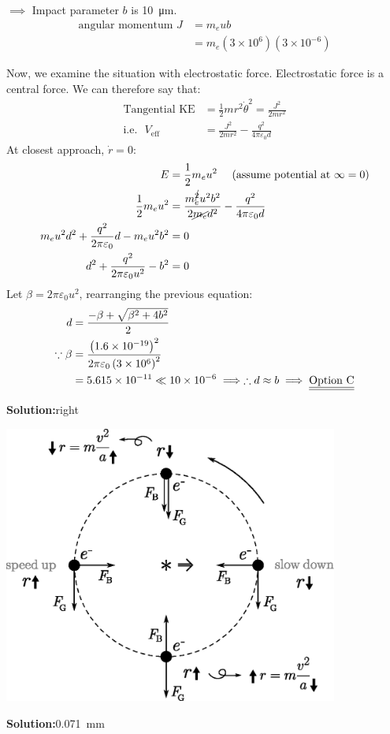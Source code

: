 \documentclass[11pt]{article}
\newcommand*\circled[1]{\tikz[baseline=(char.base)]{
		\node[shape=circle,draw,inner sep=2pt] (char) {#1};}}
\def\doubleunderline#1{\underline{\underline{#1}}}
\newcommand{\solution}[2]{\textbf{Solution:\hspace{1em}\circled{#1}}\hspace{1em}#2\hspace{1em}}
\begin{document}
\begin{enumerate}[label={[Q\arabic*]},itemsep={1em}]
\begin{minipage}{\textwidth - 5.1cm}
				$\implies$ Impact parameter $b$ is \SI{10}{\micro\meter}.
				\begin{align*}
					\text{angular momentum } J &= m_e u b \\
					 &= m_e\left(3\times 10^6\right)\left(3\times10^{-6}\right)
				\end{align*}
			\end{minipage}
		
			Now, we examine the situation with electrostatic force. Electrostatic force is a central force.  We can therefore say that:
			\begin{align}
				\text{Tangential KE} &= \frac{1}{2}mr^2\dot{\theta}^2 = \frac{J^2}{2mr^2} \\
				\text{i.e. ~} V_{\text{eff}} &= \frac{J^2}{2mr^2} - \frac{q^2}{4\pi\varepsilon_0 d}
			\end{align}
			At closest approach, $\dot{r} = 0$:
			\begin{align*}
				E &= \frac{1}{2} m_eu^2 \text{~~~~(assume potential at $\infty = 0$)} \\
				\frac{1}{2}m_eu^2 &= \frac{m_e^{\cancel{2}}u^2b^2}{2\cancel{m_e}d^2} - \frac{q^2}{4\pi\varepsilon_0 d}\\
				m_e u^2d^2 + \frac{q^2}{2\pi \varepsilon_0}d - m_eu^2b^2 &=	0 \\
				d^2 + \frac{q^2}{2\pi\varepsilon_0u^2} - b^2 &= 0
			\end{align*}
			Let $\beta = 2\pi\varepsilon_0u^2$, rearranging the previous equation:
			\begin{align*}
				d&= \frac{-\beta+\sqrt{\beta^2+4b^2}}{2} \\
				\because \beta &= \frac{\left(1.6\times 10^{-19}\right)^2}{2\pi\varepsilon_0\left(3\times10^6\right)^2} \\
				&= 5.615 \times 10^{-11} \ll 10\times 10^{-6} \implies \therefore  d \approx b \implies \text{\doubleunderline{Option C}}
			\end{align*}
		\vfill
		\item \solution{A}{right}
			\begin{center}
				\includegraphics[width=11cm]{39.eps}
			\end{center}
		\vfill
		\pagebreak
		\item \solution{D}{\SI{0.071}{\milli\meter}}
		

\end{enumerate}
\end{document}
